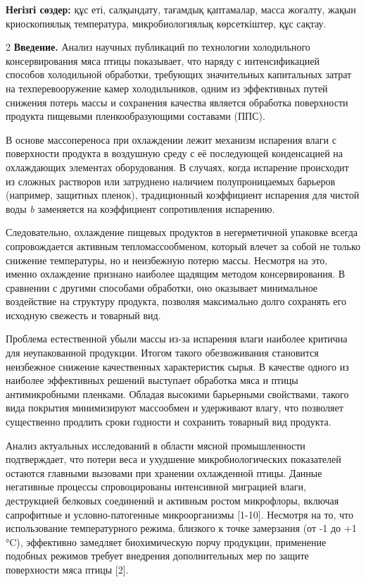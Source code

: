 {\bfseries Негізгі сөздер:} құс еті, салқындату, тағамдық қаптамалар, масса
жоғалту, жақын криоскопиялық температура, микробиологиялық көрсеткіштер,
құс сақтау.

\begin{multicols}{2}
{\bfseries Введение.} Анализ научных публикаций по технологии холодильного
консервирования мяса птицы показывает, что наряду с ин­тенсифика­цией
способов холодильной обработки, требующих значительных капитальных
затрат на техперевооружение камер холодильни­ков, одним из эффективных
путей снижения потерь массы и сохранения качества является обработка
поверхности продукта пище­выми пленкообра­зующими составами (ППС).

В основе массопереноса при охлаждении лежит механизм испарения влаги с
поверхности продукта в воздушную среду с её последующей конденсацией на
охлаждающих элементах оборудования. В случаях, когда испарение
происходит из сложных растворов или затруднено наличием полупроницаемых
барьеров (например, защитных пленок), традиционный коэффициент испарения
для чистой воды \emph{b} заменяется на коэффициент
сопротивления испарению.

Следовательно, охлаждение пищевых продуктов в негерметичной упаковке
всегда сопровождается активным тепломассообменом, который влечет за
собой не только снижение температуры, но и неизбежную потерю массы.
Несмотря на это, именно охлаждение признано наиболее щадящим методом
консервирования. В сравнении с другими способами обработки, оно
оказывает минимальное воздействие на структуру продукта, позволяя
максимально долго сохранять его исходную свежесть и товарный вид.

Проблема естественной убыли массы из-за испарения влаги наиболее
критична для неупакованной продукции. Итогом такого обезвоживания
становится неизбежное снижение качественных характеристик сырья. В
качестве одного из наиболее эффективных решений выступает обработка мяса
и птицы антимикробными пленками. Обладая высокими барьерными свойствами,
такого вида покрытия минимизируют массообмен и удерживают влагу, что
позволяет существенно продлить сроки годности и сохранить товарный вид
продукта.

Анализ актуальных исследований в области мясной промышленности
подтверждает, что потери веса и ухудшение микробиологических показателей
остаются главными вызовами при хранении охлажденной птицы. Данные
негативные процессы спровоцированы интенсивной миграцией влаги,
деструкцией белковых соединений и активным ростом микрофлоры, включая
сапрофитные и условно-патогенные микроорганизмы {[}1-10{]}. Несмотря на
то, что использование температурного режима, близкого к точке замерзания
(от -1 до +1 °C), эффективно замедляет биохимическую порчу продукции,
применение подобных режимов требует внедрения дополнительных мер по
защите поверхности мяса птицы {[}2{]}.


\end{multicols}
